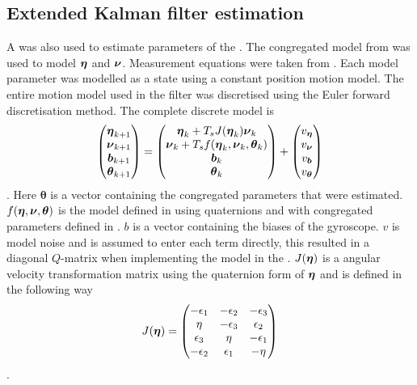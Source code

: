 \subsection{Extended Kalman filter estimation}
A \abbrEKF was also used to estimate parameters of the \abbrROV. The congregated model from  was used to model $\boldsymbol{\eta}$ and $\boldsymbol{\nu}$. Measurement equations were taken from . Each model parameter was modelled as a state using a constant position motion model. The entire motion model used in the filter was discretised using the Euler forward discretisation method. The complete discrete model is
\begin{equation}
\label{eq:motionModelKalman}
\begin{pmatrix}
\boldsymbol{\eta}_{k+1}\\ 
\boldsymbol{\nu}_{k+1}\\
\boldsymbol{b}_{k+1}\\
\boldsymbol{\theta}_{k+1}
\end{pmatrix} = 
\begin{pmatrix}
\boldsymbol{\eta}_k + T_s J(\boldsymbol{\eta}_k)\boldsymbol{\nu}_k\\
\boldsymbol{\nu}_k + T_s f(\boldsymbol{\eta}_k,\boldsymbol{\nu}_k,\boldsymbol{\theta}_k)\\
\boldsymbol{b}_k\\
\boldsymbol{\theta}_k
\end{pmatrix}
+ \begin{pmatrix}
v_{\boldsymbol{\eta}}\\
v_{\boldsymbol{\nu}}\\
v_{\boldsymbol{b}}\\
v_{\boldsymbol{\theta}}
\end{pmatrix}
\end{equation}.
Here $\boldsymbol{\theta}$ is a vector containing the congregated parameters that were estimated. $f(\boldsymbol{\eta},\boldsymbol{\nu},\boldsymbol{\theta})$ is the model defined in  using quaternions and with congregated parameters defined in . $b$ is a vector containing the biases of the gyroscope. $v$ is model noise and is assumed to enter each term directly, this resulted in a diagonal $Q$-matrix when implementing the model in the \abbrEKF. $J(\boldsymbol{\eta})$ is a angular velocity transformation matrix using the quaternion form of $\boldsymbol{\eta}$ and is defined in the following way
\begin{equation}
J(\boldsymbol{\eta}) = \begin{pmatrix}
-\epsilon_1  & -\epsilon_2  & -\epsilon_3 \\
\eta   & -\epsilon_3 & \epsilon_2   \\
\epsilon_3 & \eta    & -\epsilon_1   \\ 
-\epsilon_2 & \epsilon_1    & -\eta   \\ 
\end{pmatrix}
\end{equation}.

